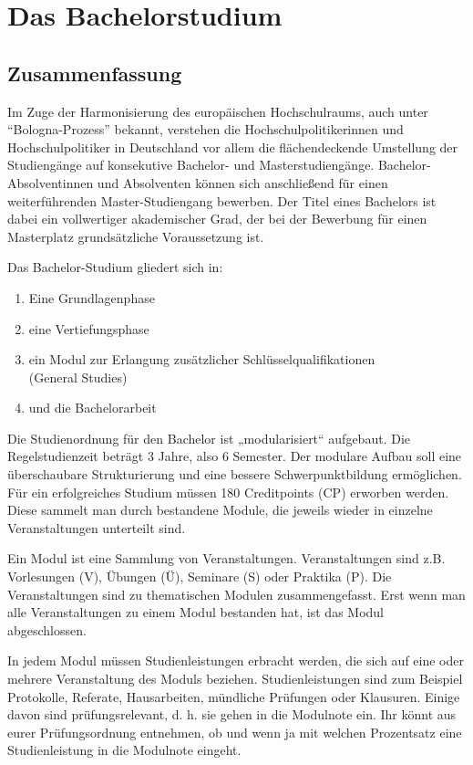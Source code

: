 \chapter{Das Bachelorstudium}
\section{Zusammenfassung}
Im Zuge der Harmonisierung des europäischen Hochschulraums, auch unter "`Bologna-Prozess"' bekannt, verstehen die Hochschulpolitikerinnen und Hochschulpolitiker in Deutschland vor allem die flächendeckende Umstellung der Studiengänge auf konsekutive Bachelor- und Masterstudiengänge. Bachelor-Absolventinnen und Absolventen können sich anschließend für einen weiterführenden Master-Studiengang bewerben. Der Titel eines Bachelors ist dabei ein vollwertiger akademischer Grad, der bei der Bewerbung für einen Masterplatz grundsätzliche Voraussetzung ist. 

Das Bachelor-Studium gliedert sich in:
\begin{enumerate}
 \item Eine Grundlagenphase
 \item eine Vertiefungsphase
 \item ein Modul zur Erlangung zusätzlicher Schlüsselqualifikationen \\(General Studies)
 \item und die Bachelorarbeit
\end{enumerate}
Die Studienordnung für den Bachelor ist „modularisiert“ aufgebaut. Die Regelstudienzeit beträgt 3 Jahre, also 6 Semester. Der modulare Aufbau soll eine überschaubare Strukturierung und eine bessere Schwerpunktbildung ermöglichen. Für ein erfolgreiches Studium müssen 180 Creditpoints (CP) erworben werden. Diese sammelt man durch bestandene Module, die jeweils wieder in einzelne Veranstaltungen unterteilt sind.

Ein Modul ist eine Sammlung von Veranstaltungen. Veranstaltungen sind z.B. Vorlesungen (V), Übungen (Ü), Seminare (S) oder Praktika (P). Die Veranstaltungen sind zu thematischen Modulen zusammengefasst. Erst wenn man alle Veranstaltungen zu einem Modul bestanden hat, ist das Modul abgeschlossen.

In jedem Modul müssen Studienleistungen erbracht werden, die sich auf eine oder mehrere Veranstaltung des Moduls beziehen. Studienleistungen sind zum Beispiel Protokolle, Referate, Hausarbeiten, mündliche Prüfungen oder Klausuren. Einige davon sind prüfungsrelevant, d. h. sie gehen in die Modulnote ein. Ihr könnt aus eurer Prüfungsordnung entnehmen, ob und wenn ja mit welchen Prozentsatz eine Studienleistung in die Modulnote eingeht.

